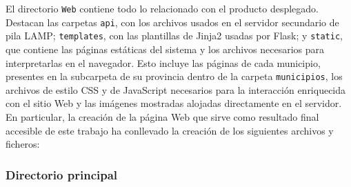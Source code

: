El directorio \texttt{Web} contiene todo lo relacionado con el producto desplegado. Destacan las carpetas \texttt{api}, con los archivos usados en el servidor secundario de pila LAMP; \texttt{templates}, con las plantillas de Jinja2 usadas por Flask; y \texttt{static}, que contiene las páginas estáticas del sistema y los archivos necesarios para interpretarlas en el navegador. Esto incluye las páginas de cada municipio, presentes en la subcarpeta de su provincia dentro de la carpeta \texttt{municipios}, los archivos de estilo CSS y de JavaScript necesarios para la interacción enriquecida con el sitio Web y las imágenes mostradas alojadas directamente en el servidor. En particular, la creación de la página Web que sirve como resultado final accesible de este trabajo ha conllevado la creación de los siguientes archivos y ficheros:

\subsubsection{Directorio principal}

